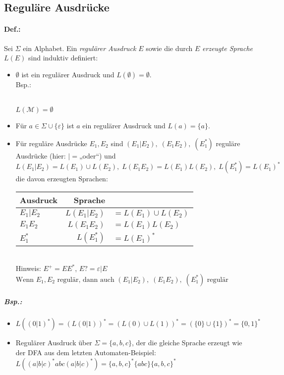 \subsection{Reguläre Ausdrücke}
\paragraph{Def.:} Sei $\Sigma$ ein Alphabet. Ein \emph{regulärer Ausdruck} $E$ sowie die durch $E$ \emph{erzeugte Sprache $L(E)$} sind induktiv definiert:
\begin{itemize}
\item $\emptyset$ ist ein regulärer Ausdruck und $L(\emptyset)=\emptyset$.\\
Bsp.: \\
\\
$L(\mathcal{M})=\emptyset$
\item Für $a \in \Sigma \cup \{\varepsilon\}$ ist $a$ ein regulärer Ausdruck und $L(a)=\{a\}$.
\item Für reguläre Ausdrücke $E_1, E_2$ sind $(E_1 | E_2), \; (E_1 E_2), \; (E_1^*)$ reguläre Ausdrücke (hier: $|=$„oder“) und $L(E_1|E_2)=L(E_1)\cup L(E_2), \; L(E_1E_2)=L(E_1)L(E_2), \; L(E_1^*)=L(E_1)^*$ die davon erzeugten Sprachen:\\
\begin{tabular}{l | r l}
Ausdruck & Sprache &\\
\hline
$E_1 | E_2$ & $L(E_1|E_2)$&$=L(E_1)\cup L(E_2)$\\
$E_1 E_2$ & $L(E_1E_2)$&$=L(E_1)L(E_2)$\\
$E_1^*$ & $L(E_1^*)$&$=L(E_1)^*$\\
\end{tabular}\medskip\\
Hinweis: $E^+=E E^*$, $E?=\varepsilon|E$\\
$\boxed{\text{Wenn }E_1, E_2 \text{ regulär, dann auch } (E_1 | E_2), \; (E_1 E_2), \; (E_1^*) \text{ regulär}}$
\end{itemize}
\subparagraph{Bsp.:} 
\begin{itemize}
\item $L( (0|1)^*) =(L(0|1))^*=(L(0)\cup L(1))^*=(\{0\}\cup\{1\})^*=\{0,1\}^*$
\item Regulärer Ausdruck über $\Sigma=\{a,b,c\}$, der die gleiche Sprache erzeugt wie der DFA aus dem letzten Automaten-Beispiel:\\
$L((a|b|c)^*abc(a|b|c)^*)=\{a,b,c\}^*\{abc\}\{a,b,c\}^*$
\end{itemize}

